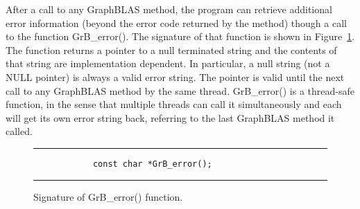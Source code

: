 After a call to any GraphBLAS method, the program can retrieve additional
error information (beyond the error code returned by the method) though a
call to the function {\sf GrB\_error()}. The signature of that function is
shown in Figure~\ref{Fig:GrB_error}.
The function returns a pointer to a null terminated string and the contents of that string
are implementation dependent. In particular, a null string (not a {\sf NULL} pointer) is always a valid error string.
The pointer is valid until the next call to any GraphBLAS method by the same thread.
{\sf GrB\_error()} is a thread-safe function, in the sense that multiple threads can
call it simultaneously and each will get its own error string back, referring to the
last GraphBLAS method it called.

\begin{figure}[htb]
	\hrule
	\vspace{1\baselineskip}
	\begin{center}
		\begin{minipage}{3in}
			\begin{verbatim}
			const char *GrB_error();
			\end{verbatim}
		\end{minipage}
	\end{center}
	\caption{Signature of {\sf GrB\_error()} function.}
	\label{Fig:GrB_error}
	\hrule
\end{figure}
